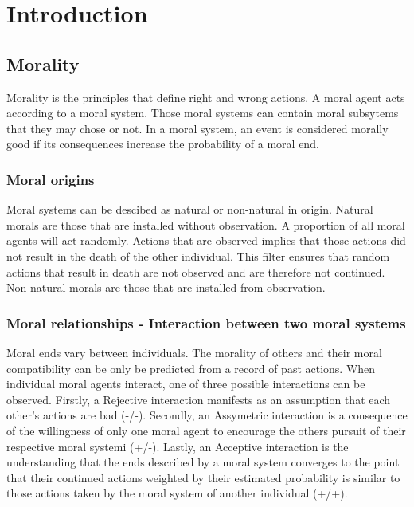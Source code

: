\chapter{Introduction}
\section{Morality}
Morality is the principles that define right and wrong actions.
A moral agent acts according to a moral system.
Those moral systems can contain moral subsytems that they may chose or not.
In a moral system, an event is considered morally good if its consequences increase the probability of a moral end.

\subsection{Moral origins}
Moral systems can be descibed as natural or non-natural in origin.
Natural morals are those that are installed without observation.
A proportion of all moral agents will act randomly.
Actions that are observed implies that those actions did not result in the death of the other individual.
This filter ensures that random actions that result in death are not observed and are therefore not continued.
Non-natural morals are those that are installed from observation.

\subsection{Moral relationships - Interaction between two moral systems}
Moral ends vary between individuals.
The morality of others and their moral compatibility can be only be predicted from a record of past actions.
When individual moral agents interact, one of three possible interactions can be observed.
Firstly, a Rejective interaction manifests as an assumption that each other's actions are bad (-/-). 
Secondly, an Assymetric interaction is a consequence of the willingness of only one moral agent to encourage the others pursuit of their respective moral systemi (+/-).
Lastly, an Acceptive interaction is the understanding that the ends described by a moral system converges to the point that their continued actions weighted by their estimated probability is similar to those actions taken by the moral system of another individual (+/+).

